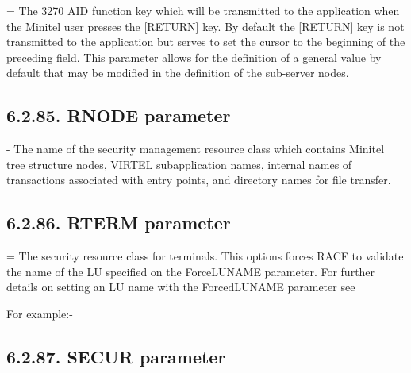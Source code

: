 \documentclass[letterpaper,10pt,english]{sphinxmanual}
\begin{document}
 = The 3270 AID function key which will be transmitted to the application when the Minitel user presses the {[}RETURN{]} key. By default the {[}RETURN{]} key is not transmitted to the application but serves to set the cursor to the beginning of the preceding field. This parameter allows for the definition of a general value by default that may be modified in the definition of the sub-server nodes.


\subsection{6.2.85. RNODE parameter}
\label{\detokenize{Installation_Guide:rnode-parameter}}
\begin{sphinxVerbatim}[commandchars=\\\{\}]
 
\end{sphinxVerbatim}

 - The name of the security management resource class which contains Minitel tree structure nodes, VIRTEL subapplication names, internal names of transactions associated with entry points, and directory names for file transfer.


\subsection{6.2.86. RTERM parameter}
\label{\detokenize{Installation_Guide:rterm-parameter}}
\begin{sphinxVerbatim}[commandchars=\\\{\}]
\end{sphinxVerbatim}

 = The security resource class for terminals. This options forces RACF to validate the name of the LU specified on the ForceLUNAME parameter. For further details on setting an LU name with the ForcedLUNAME parameter see 

For example:-

\begin{sphinxVerbatim}[commandchars=\\\{\}]
\end{sphinxVerbatim}


\subsection{6.2.87. SECUR parameter}
\label{\detokenize{Installation_Guide:secur-parameter}}
\begin{sphinxVerbatim}[commandchars=\\\{\}]
 
\end{sphinxVerbatim}
\end{document}
